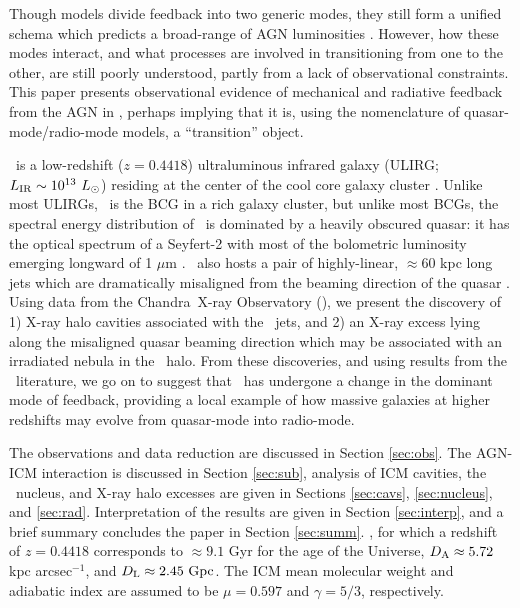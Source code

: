\documentclass[useAMS,usenatbib]{mn2e}
\begin{document}
Though models divide feedback into two generic modes, they still form
a unified schema \citep[\eg][]{sijacki07} which predicts a broad-range
of AGN luminosities \citep[\eg][]{2009ApJ...698.1550H}. However, how
these modes interact, and what processes are involved in transitioning
from one to the other, are still poorly understood, partly from a lack
of observational constraints. This paper presents observational
evidence of mechanical and radiative feedback from the AGN in \irs,
perhaps implying that it is, using the nomenclature of
quasar-mode/radio-mode models, a ``transition'' object.

\irs\ is a low-redshift ($z = 0.4418$) ultraluminous infrared galaxy
(ULIRG; $L_{\rm{IR}} \sim 10^{13} ~L_{\odot}$) residing at the center of
the cool core galaxy cluster \object{\rxj}. Unlike most ULIRGs,
\irs\ is the BCG in a rich galaxy cluster, but unlike most BCGs, the
spectral energy distribution of \irs\ is dominated by a heavily
obscured quasar: it has the optical spectrum of a Seyfert-2 with most
of the bolometric luminosity emerging longward of 1 $\mu$m
\citep{1988ApJ...328..161K, 1993ApJ...415...82H, 1994ApJ...436L..51F,
  1998ApJ...506..205E, 2000A&A...353..910F,
  2001MNRAS.321L..15I}. \irs\ also hosts a pair of highly-linear,
$\approx 60$ kpc long jets which are dramatically misaligned from the
beaming direction of the quasar \citep[][hereafter H93 and H99,
  respectively]{1993ApJ...415...82H, 1999ApJ...512..145H}. Using data
from the Chandra\ X-ray Observatory (\cxo), we present the discovery
of 1) X-ray halo cavities associated with the \irs\ jets, and 2) an
X-ray excess lying along the misaligned quasar beaming direction which
may be associated with an irradiated nebula in the \irs\ halo. From
these discoveries, and using results from the \irs\ literature, we go
on to suggest that \irs\ has undergone a change in the dominant mode
of feedback, providing a local example of how massive galaxies at
higher redshifts may evolve from quasar-mode into radio-mode.

The observations and data reduction are discussed in Section
\ref{sec:obs}. The AGN-ICM interaction is discussed in Section
\ref{sec:sub}, analysis of ICM cavities, the \irs\ nucleus, and X-ray
halo excesses are given in Sections \ref{sec:cavs}, \ref{sec:nucleus},
and \ref{sec:rad}. Interpretation of the results are given in Section
\ref{sec:interp}, and a brief summary concludes the paper in Section
\ref{sec:summ}. \LCDM, for which a redshift of $z = 0.4418$
corresponds to $\approx 9.1$ Gyr for the age of the Universe, $D_{\rm{A}}
\approx 5.72$ kpc arcsec$^{-1}$, and $D_{\rm{L}} \approx 2.45~\mbox{\ensuremath{\rm{Gpc}}}$. The ICM
mean molecular weight and adiabatic index are assumed to be $\mu =
0.597$ and $\gamma = 5/3$, respectively.
\end{document}
